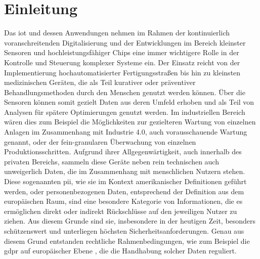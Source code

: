 
\section{Einleitung}
\label{sec:Einleitung}

Das \ac{iot} und dessen Anwendungen nehmen im Rahmen der kontinuierlich voranschreitenden Digitalisierung und der Entwicklungen im Bereich kleinster Sensoren und hochleistungsfähiger Chips eine immer wichtigere Rolle in der Kontrolle und Steuerung komplexer Systeme ein.
Der Einsatz reicht von der Implementierung hochautomatisierter Fertigungsstraßen bis hin zu kleinsten medizinischen Geräten, die als Teil kurativer oder präventiver Behandlungsmethoden durch den Menschen genutzt werden können.
Über die Sensoren können somit gezielt Daten aus deren Umfeld erhoben und als Teil von Analysen für spätere Optimierungen genutzt werden. Im industriellen Bereich wären dies zum Beispiel die Möglichkeiten zur gezielteren Wartung von einzelnen Anlagen im Zusammenhang mit Industrie 4.0, auch vorausschauende Wartung genannt, oder der fein-granularen Überwachung von einzelnen Produktionsschritten.
Aufgrund ihrer Allgegenwärtigkeit, auch innerhalb des privaten Bereichs, sammeln diese Geräte neben rein technischen auch unweigerlich Daten, die im Zusammenhang mit menschlichen Nutzern stehen.
Diese sogenannten \ac{pii}, wie sie im Kontext amerikanischer Definitionen geführt werden, oder personenbezogenen Daten, entsprechend der Definition aus dem europäischen Raum, sind eine besondere Kategorie von Informationen, die es ermöglichen direkt oder indirekt Rückschlüsse auf den jeweiligen Nutzer zu ziehen. Aus diesem Grunde sind sie, insbesondere in der heutigen Zeit, besonders schützenswert und unterliegen höchsten Sicherheitsanforderungen.
Genau aus diesem Grund entstanden rechtliche Rahmenbedingungen, wie zum Beispiel die \ac{gdpr} auf europäischer Ebene \cite{Dsgvo2016}, die die Handhabung solcher Daten reguliert.


